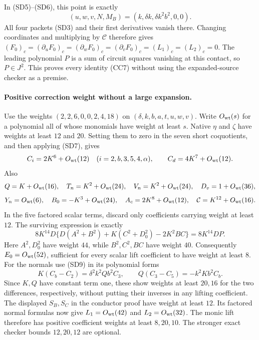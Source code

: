 In (SD5)--(SD6), this point is exactly
\[
 (u,w,v,N,M_B)=(k,\delta k,\delta k^2b^2,0,0).
\]
All four packets (SD3) and their first derivatives vanish there.
Changing coordinates and multiplying by $\mathcal C$ therefore gives
$(F_0)_c=(\partial_uF_0)_c=(\partial_wF_0)_c
=(\partial_vF_0)_c=(L_1)_c=(L_2)_c=0$.
The leading polynomial $P$ is a sum of circuit squares vanishing at
this contact, so $P\in J^2$. This proves every identity (CC7) without
using the expanded-source checker as a premise.

\paragraph{Positive correction weight without a large expansion.}
Use the weights $(2,2,6,0,0,2,4,18)$ on
$(\delta,k,b,a,t,u,w,v)$. Write $O_{\rm wt}(s)$ for a polynomial all
of whose monomials have weight at least $s$. Native $\eta$ and $\zeta$
have weights at least $12$ and $20$. Setting them to zero in the seven
short coquotients, and then applying (SD7), gives
\[
 C_i=2K^6+O_{\rm wt}(12)\quad(i=2,b,3,5,4,\alpha),\qquad
 C_d=4K^7+O_{\rm wt}(12).
\]
Also
\[
 Q=K+O_{\rm wt}(16),\quad T_n=K^2+O_{\rm wt}(24),\quad
 V_n=K^2+O_{\rm wt}(24),\quad D_v=1+O_{\rm wt}(36),
\]
\[
 Y_n=O_{\rm wt}(6),\quad B_0=-K^3+O_{\rm wt}(24),\quad
 A_c=2K^8+O_{\rm wt}(12),\quad
 \mathcal C=K^{12}+O_{\rm wt}(16).
\]
In the five factored scalar terms, discard only coefficients carrying
weight at least $12$. The surviving expression is exactly
\[
 8K^{14}D\{D(A^2+B^2)+K(C^2+D_0^2)-2K^2BC\}
       =8K^{14}DP.
\]
Here $A^2,D_0^2$ have weight $44$, while $B^2,C^2,BC$ have weight $40$.
Consequently $E_0=O_{\rm wt}(52)$, sufficient for every scalar lift
coefficient to have weight at least $8$.
For the normals use (SD9) in its polynomial forms
\[
 K(C_b-C_2)=\delta^2k^2Qb^2C_3,\qquad
 Q(C_3-C_5)=-k^2Kb^2C_b.
\]
Since $K,Q$ have constant term one, these show weights at least $20,16$
for the two differences, respectively, without putting their inverses
in any lifting coefficient. The displayed $S_B,S_C$ in the conductor
proof have weight at least $12$. Its factored normal formulas now give
$L_1=O_{\rm wt}(42)$ and $L_2=O_{\rm wt}(32)$.
The monic lift therefore has positive coefficient weights at least
$8,20,10$. The stronger exact checker bounds $12,20,12$ are optional.

